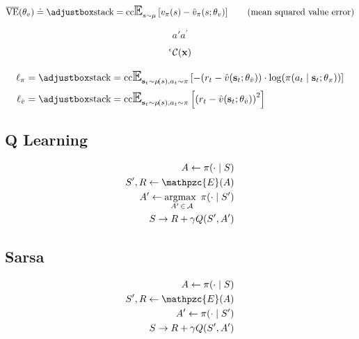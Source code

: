 \documentclass[a4paper,11pt]{article}
\begin{document}
\begin{equation}
	\apply{\overline{\mathrm{VE}}}{\theta_{v}}\define\applyb{\expect_{s\obey \mu}}{\apply{v_{\pi}}{s}-\apply{\pred{v}_{\pi}}{s;\theta_{v}}} \tag{mean squared value error}
\end{equation}

\begin{equation}
	a' a^{\prime}
\end{equation}

\begin{equation}
	{}^{\epsilon}\mathcal{C}\!\left(\mathbf{x}\right)
\end{equation}

\begin{align*}
	\ell_{\pi}&=\applyb{\expect_{\ve{s}_{t}\obey \apply{\mu}{s},a_{t}\obey\pi}}{-{\prth{r_{t}-\apply{\pred{v}}{\ve{s}_{t};\theta_{\pred{v}}}}\cdot\apply{\log}{\apply{\pi}{a_{t} \mid \ve{s}_{t};\theta_{\pi}}}}} \\
	\ell_{\pred{v}} &= \applyb{\expect_{\ve{s}_{t}\obey \apply{\mu}{s},a_{t}\obey\pi}}{\prth{r_{t}-\apply{\pred{v}}{\ve{s}_{t};\theta_{\pred{v}}}}^{2}}
\end{align*}

\newcommand{\env}{\mathpzc{E}}

\subsection{Q Learning} %
\label{sub:q_learning}

\begin{align}
	A \generate \apply{\pi}{\cdot \mid S} \\
	S',R\generate \apply{\env}{A} \\
	A' \generate \argmax_{A'\isin\set{A}}\apply{\pi}{\cdot \mid S'} \\
	S \to R + \gamma \apply{Q}{S',A'}
\end{align}


\subsection{Sarsa} %
\label{sub:sarsa}

\begin{align}
	A \generate \apply{\pi}{\cdot \mid S} \\
	S',R\generate \apply{\env}{A} \\
	A' \generate \apply{\pi}{\cdot \mid S'} \\
	S \to R + \gamma \apply{Q}{S',A'}
\end{align}
\end{document}
